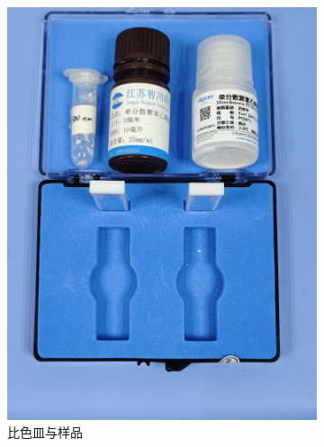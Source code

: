 \documentclass[a4paper]{report} %
\begin{document}
\begin{figure}[H]
\begin{subfigure}{0.22\textwidth}
        \includegraphics[width=\linewidth]{比色皿.jpg}
        \caption{比色皿与样品}
    \end{subfigure}
    \begin{subfigure}{0.22\textwidth}

\end{subfigure}
\end{figure}
\end{document}
